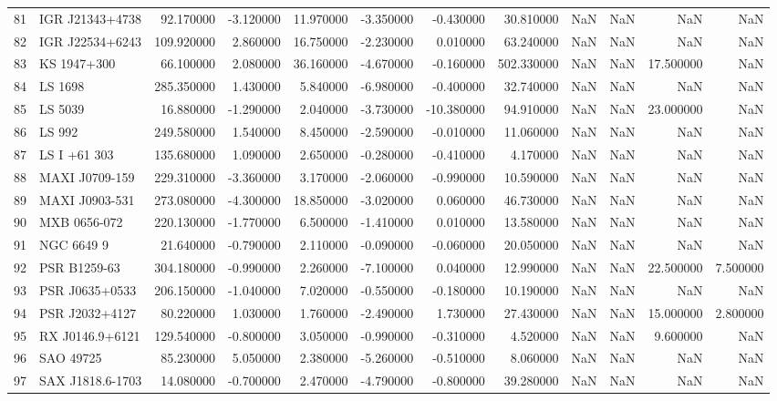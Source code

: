 \begin{tabular}{llrrrrrrrrrr}
81 & IGR J21343+4738 & 92.170000 & -3.120000 & 11.970000 & -3.350000 & -0.430000 & 30.810000 & NaN & NaN & NaN & NaN \\
82 & IGR J22534+6243 & 109.920000 & 2.860000 & 16.750000 & -2.230000 & 0.010000 & 63.240000 & NaN & NaN & NaN & NaN \\
83 & KS 1947+300 & 66.100000 & 2.080000 & 36.160000 & -4.670000 & -0.160000 & 502.330000 & NaN & NaN & 17.500000 & NaN \\
84 & LS 1698 & 285.350000 & 1.430000 & 5.840000 & -6.980000 & -0.400000 & 32.740000 & NaN & NaN & NaN & NaN \\
85 & LS 5039 & 16.880000 & -1.290000 & 2.040000 & -3.730000 & -10.380000 & 94.910000 & NaN & NaN & 23.000000 & NaN \\
86 & LS 992 & 249.580000 & 1.540000 & 8.450000 & -2.590000 & -0.010000 & 11.060000 & NaN & NaN & NaN & NaN \\
87 & LS I +61 303 & 135.680000 & 1.090000 & 2.650000 & -0.280000 & -0.410000 & 4.170000 & NaN & NaN & NaN & NaN \\
88 & MAXI J0709-159 & 229.310000 & -3.360000 & 3.170000 & -2.060000 & -0.990000 & 10.590000 & NaN & NaN & NaN & NaN \\
89 & MAXI J0903-531 & 273.080000 & -4.300000 & 18.850000 & -3.020000 & 0.060000 & 46.730000 & NaN & NaN & NaN & NaN \\
90 & MXB 0656-072 & 220.130000 & -1.770000 & 6.500000 & -1.410000 & 0.010000 & 13.580000 & NaN & NaN & NaN & NaN \\
91 & NGC 6649 9 & 21.640000 & -0.790000 & 2.110000 & -0.090000 & -0.060000 & 20.050000 & NaN & NaN & NaN & NaN \\
92 & PSR B1259-63 & 304.180000 & -0.990000 & 2.260000 & -7.100000 & 0.040000 & 12.990000 & NaN & NaN & 22.500000 & 7.500000 \\
93 & PSR J0635+0533 & 206.150000 & -1.040000 & 7.020000 & -0.550000 & -0.180000 & 10.190000 & NaN & NaN & NaN & NaN \\
94 & PSR J2032+4127 & 80.220000 & 1.030000 & 1.760000 & -2.490000 & 1.730000 & 27.430000 & NaN & NaN & 15.000000 & 2.800000 \\
95 & RX J0146.9+6121 & 129.540000 & -0.800000 & 3.050000 & -0.990000 & -0.310000 & 4.520000 & NaN & NaN & 9.600000 & NaN \\
96 & SAO 49725 & 85.230000 & 5.050000 & 2.380000 & -5.260000 & -0.510000 & 8.060000 & NaN & NaN & NaN & NaN \\
97 & SAX J1818.6-1703 & 14.080000 & -0.700000 & 2.470000 & -4.790000 & -0.800000 & 39.280000 & NaN & NaN & NaN & NaN \\

\end{tabular}
